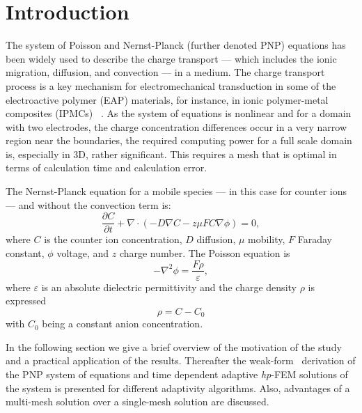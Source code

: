 \section{Introduction}
The system of Poisson and Nernst-Planck (further denoted PNP) 
equations has been widely
used to describe the charge transport --- which includes the ionic
migration, diffusion, and convection --- in a medium. 
The charge transport process is a key mechanism
for electromechanical transduction in some of the electroactive polymer
(EAP) materials, for instance, in ionic polymer-metal composites (IPMCs)~
\cite{basu1997membrane,shahinpoor2001smartmat,
nasser2002applied,newbury2003intelligent, wallmersperger2007appliedphysics,
pugal2008appliedphysics,pugal2010polymer}.
As the system of equations is nonlinear and for a domain with two
electrodes, the charge concentration differences occur in a very narrow
region near the boundaries, the required computing power for a full
scale domain is, especially in 3D, rather significant. This
requires a mesh that is optimal in terms of calculation time and calculation
error.

The Nernst-Planck equation for a mobile species ---
in this case for counter ions --- and without the convection term is:
\begin{equation}
  \frac{\partial C}{\partial t}+\nabla\cdot(-D\nabla C-z\mu FC\nabla\phi)=0,
  \label{eq:nernst-planck}
\end{equation}
where $C$ is the counter ion concentration, $D$ diffusion, $\mu$ mobility,
$F$ Faraday constant, $\phi$ voltage, and $z$ charge number. The Poisson
equation is
\begin{equation}
  -\nabla^2\phi=\frac{F\rho}{\varepsilon},
  \label{eq:poisson}
\end{equation}
where $\varepsilon$ is an absolute dielectric permittivity and the
charge density $\rho$ is expressed
\begin{equation}
  \rho=C-C_{0}
  \label{eq:rho}
\end{equation}
with $C_{0}$ being a constant anion concentration.

In the following section we give a brief overview of the motivation
of the study and a practical application of the results. 
Thereafter the weak-form~\cite{Hermes-book} derivation of the PNP system of equations
and time dependent adaptive \emph{hp}-FEM solutions of the system is presented
for different adaptivity algorithms. 
Also, advantages of a multi-mesh solution over a single-mesh solution are discussed.


